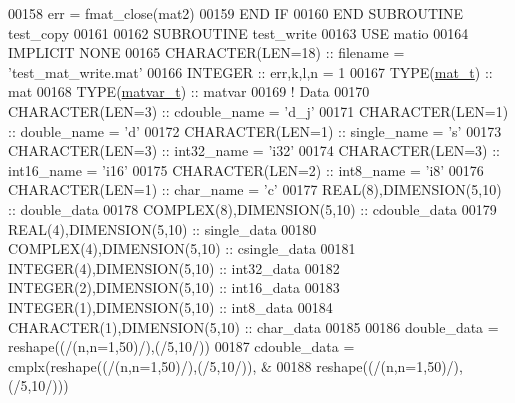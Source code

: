\begin{DoxyCode}
00158             err = fmat\_close(mat2)
00159 \textcolor{keywordflow}{        END IF}
00160 \textcolor{keyword}{    END SUBROUTINE }test\_copy
00161 
00162 \textcolor{keyword}{    SUBROUTINE }test\_write
00163     \textcolor{keywordtype}{USE }matio
00164     \textcolor{keywordtype}{IMPLICIT NONE}
00165         \textcolor{keywordtype}{CHARACTER(LEN=18)}  :: filename = \textcolor{stringliteral}{'test\_mat\_write.mat'}
00166         \textcolor{keywordtype}{INTEGER}            :: err,k,l,n = 1
00167         \textcolor{keywordtype}{TYPE}(\hyperlink{group___m_a_t_gab0fc888f5a5d79943b16284b1f91c2e8}{mat\_t})        :: mat
00168         \textcolor{keywordtype}{TYPE}(\hyperlink{group___m_a_t_structmatvar__t}{matvar\_t})     :: matvar
00169         \textcolor{comment}{! Data}
00170         \textcolor{keywordtype}{CHARACTER(LEN=3)}           :: cdouble\_name = \textcolor{stringliteral}{'d\_j'}
00171         \textcolor{keywordtype}{CHARACTER(LEN=1)}           :: double\_name = \textcolor{stringliteral}{'d'}
00172         \textcolor{keywordtype}{CHARACTER(LEN=1)}           :: single\_name = \textcolor{stringliteral}{'s'}
00173         \textcolor{keywordtype}{CHARACTER(LEN=3)}           :: int32\_name  = \textcolor{stringliteral}{'i32'}
00174         \textcolor{keywordtype}{CHARACTER(LEN=3)}           :: int16\_name  = \textcolor{stringliteral}{'i16'}
00175         \textcolor{keywordtype}{CHARACTER(LEN=2)}           :: int8\_name   = \textcolor{stringliteral}{'i8'}
00176         \textcolor{keywordtype}{CHARACTER(LEN=1)}           :: char\_name   = \textcolor{stringliteral}{'c'}
00177         \textcolor{keywordtype}{REAL(8)},\textcolor{keywordtype}{DIMENSION(5,10)}    :: double\_data
00178         \textcolor{keywordtype}{COMPLEX(8)},\textcolor{keywordtype}{DIMENSION(5,10)} :: cdouble\_data
00179         \textcolor{keywordtype}{REAL(4)},\textcolor{keywordtype}{DIMENSION(5,10)}    :: single\_data
00180         \textcolor{keywordtype}{COMPLEX(4)},\textcolor{keywordtype}{DIMENSION(5,10)} :: csingle\_data
00181         \textcolor{keywordtype}{INTEGER(4)},\textcolor{keywordtype}{DIMENSION(5,10)} :: int32\_data
00182         \textcolor{keywordtype}{INTEGER(2)},\textcolor{keywordtype}{DIMENSION(5,10)} :: int16\_data
00183         \textcolor{keywordtype}{INTEGER(1)},\textcolor{keywordtype}{DIMENSION(5,10)} :: int8\_data
00184         \textcolor{keywordtype}{CHARACTER(1)},\textcolor{keywordtype}{DIMENSION(5,10)} :: char\_data
00185 
00186         double\_data  = reshape((/(n,n=1,50)/),(/5,10/))
00187         cdouble\_data = cmplx(reshape((/(n,n=1,50)/),(/5,10/)),  &
00188                              reshape((/(n,n=1,50)/),(/5,10/)))

\end{DoxyCode}
